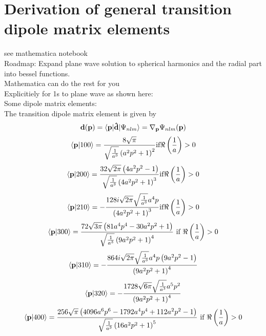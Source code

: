\section{Derivation of general transition dipole matrix elements}
see mathematica notebook\\
Roadmap: Expand plane wave solution to spherical harmonics and the radial part into bessel functions.\\
Mathematica can do the rest for you\\
Explicitiely for 1s to plane wave as shown here:\\
Some dipole matrix elements:\\
The transition dipole matrix element is given by
\begin{equation*}
    \mathbf{d}(\mathbf{p}) = \braket{\mathbf{p}|\mathbf{\hat{d}}|\Psi_{nlm}} = \nabla_{\mathbf{p}}\Psi_{nlm}(\mathbf{p})
\end{equation*}
\begin{equation*}
    \braket{\mathbf{p}|100} = \frac{8 \sqrt{\pi }}{\sqrt{\frac{1}{a^3}} \left(a^2 p^2+1\right)^2}\text{if}\Re\left(\frac{1}{a}\right)>0
\end{equation*}
\begin{equation*}
    \braket{\mathbf{p}|200} = \frac{32 \sqrt{2 \pi } \left(4 a^2 p^2-1\right)}{\sqrt{\frac{1}{a^3}} \left(4 a^2 p^2+1\right)^3}\text{if}\Re\left(\frac{1}{a}\right)>0
\end{equation*}
\begin{equation*}
    \braket{\mathbf{p}|210} = -\frac{128 i \sqrt{2 \pi } \sqrt{\frac{1}{a^3}} a^4 p}{\left(4 a^2 p^2+1\right)^3}\text{if}\Re\left(\frac{1}{a}\right)>0
\end{equation*}
\begin{equation*}
    \braket{\mathbf{p}|300} = \frac{72 \sqrt{3 \pi } \left(81 a^4 p^4-30 a^2 p^2+1\right)}{\sqrt{\frac{1}{a^3}} \left(9 a^2p^2+1\right)^4}\text{ if }\Re\left(\frac{1}{a}\right)>0
\end{equation*}
\begin{equation*}
    \braket{\mathbf{p}|310} = -\frac{864 i \sqrt{2 \pi } \sqrt{\frac{1}{a^3}} a^4 p \left(9 a^2 p^2-1\right)}{\left(9 a^2 p^2+1\right)^4}
\end{equation*}
\begin{equation*}
    \braket{\mathbf{p}|320} = -\frac{1728 \sqrt{6 \pi } \sqrt{\frac{1}{a^3}} a^5 p^2}{\left(9 a^2 p^2+1\right)^4}
\end{equation*}
\begin{equation*}
    \braket{\mathbf{p}|400} = \frac{256 \sqrt{\pi } \left(4096 a^6 p^6-1792 a^4 p^4+112 a^2 p^2-1\right)}{\sqrt{\frac{1}{a^3}}\left(16 a^2 p^2+1\right)^5}\text{ if }\Re\left(\frac{1}{a}\right)>0
\end{equation*}
